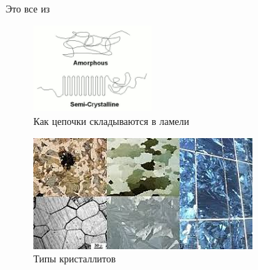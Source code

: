 Это все из \cite{cryst1}

	\begin{figure} 
\vspace{-20pt}


  \begin{center}
    \includegraphics[width=0.4\textwidth]{fig/crystal-1.png}
    \caption{Как цепочки складываются в ламели}
    \label{fig:crystal-1}
  \end{center}
  \vspace{-20pt}
  \vspace{1pt}
\end{figure}



\begin{figure}[h]
    \includegraphics[width=\textwidth]{fig/crystallites.jpg}
    \caption{Типы кристаллитов}
    \label{fig:crystallites}
\end{figure}



